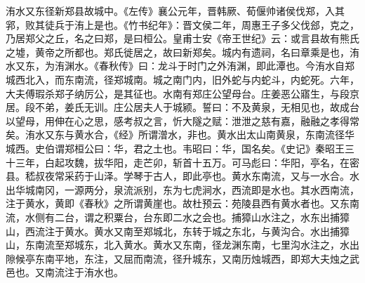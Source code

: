 \documentclass[12pt,UTF8]{ctexbook}
\begin{document}
洧水又东径新郑县故城中。《左传》襄公元年，晋韩厥、荀偃帅诸侯伐郑，入其郛，败其徒兵于洧上是也。《竹书纪年》：晋文侯二年，周惠王子多父伐郐，克之，乃居郑父之丘，名之曰郑，是曰桓公。皇甫士安《帝王世纪》云：或言县故有熊氏之墟，黄帝之所都也。郑氏徙居之，故曰新郑矣。城内有遗祠，名曰章乘是也，洧水又东，为洧渊水。《春秋传》曰：龙斗于时门之外洧渊，即此潭也。今洧水自郑城西北入，而东南流，径郑城南。城之南门内，旧外蛇与内蛇斗，内蛇死。六年，大夫傅瑕杀郑子纳厉公，是其征也。水南有郑庄公望母台。庄姜恶公寤生，与段京居。段不弟，姜氏无训。庄公居夫人于城颍。誓曰：不及黄泉，无相见也，故成台以望母，用伸在心之思，感考叔之言，忻大隧之赋：泄泄之慈有嘉，融融之孝得常矣。洧水又东与黄水合，《经》所谓潧水，非也。黄水出太山南黄泉，东南流径华城西。史伯谓郑桓公曰：华，君之土也。韦昭曰：华，国名矣。《史记》秦昭王三十三年，白起攻魏，拔华阳，走芒卯，斩首十五万。可马彪曰：华阳，亭名，在密县。嵇叔夜常采药于山泽。学琴于古人，即此亭也。黄水东南流，又与一水合。水出华城南冈，一源两分，泉流派别，东为七虎涧水，西流即是水也。其水西南流，注于黄水，黄即《春秋》之所谓黄崖也。故杜预云：苑陵县西有黄水者也。又东南流，水侧有二台，谓之积粟台，台东即二水之会也。捕獐山水注之，水东出捕獐山，西流注于黄水。黄水又南至郑城北，东转于城之东北，与黄沟合。水出捕獐山，东南流至郑城东，北入黄水。黄水又东南，径龙渊东南，七里沟水注之，水出隙候亭东南平地，东注，又屈而南流，径升城东，又南历烛城西，即郑大夫烛之武邑也。又南流注于洧水也。
\end{document}
